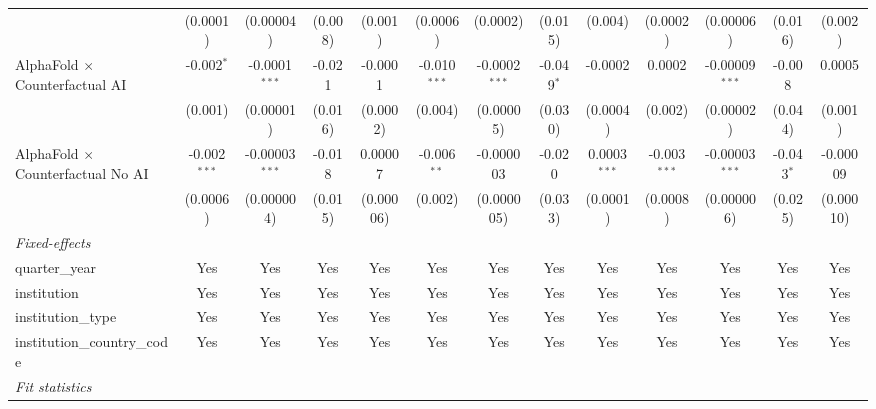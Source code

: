 \begin{tabular}{lcccccccccccc}
                                            & (0.0001)       & (0.00004)        & (0.008) & (0.001)       & (0.0006)       & (0.0002)        & (0.015)      & (0.004)        & (0.0002)       & (0.00006)        & (0.016)      & (0.002)\\   
   AlphaFold $\times$ Counterfactual AI     & -0.002$^{*}$   & -0.0001$^{***}$  & -0.021  & -0.0001       & -0.010$^{***}$ & -0.0002$^{***}$ & -0.049$^{*}$ & -0.0002        & 0.0002         & -0.00009$^{***}$ & -0.008       & 0.0005\\   
                                            & (0.001)        & (0.00001)        & (0.016) & (0.0002)      & (0.004)        & (0.00005)       & (0.030)      & (0.0004)       & (0.002)        & (0.00002)        & (0.044)      & (0.001)\\   
   AlphaFold $\times$ Counterfactual No AI  & -0.002$^{***}$ & -0.00003$^{***}$ & -0.018  & 0.00007       & -0.006$^{**}$  & -0.000003       & -0.020       & 0.0003$^{***}$ & -0.003$^{***}$ & -0.00003$^{***}$ & -0.043$^{*}$ & -0.00009\\   
                                            & (0.0006)       & (0.000004)       & (0.015) & (0.00006)     & (0.002)        & (0.000005)      & (0.033)      & (0.0001)       & (0.0008)       & (0.000006)       & (0.025)      & (0.00010)\\   
   \midrule
   \emph{Fixed-effects}\\
   quarter\_year                            & Yes            & Yes              & Yes     & Yes           & Yes            & Yes             & Yes          & Yes            & Yes            & Yes              & Yes          & Yes\\  
   institution                              & Yes            & Yes              & Yes     & Yes           & Yes            & Yes             & Yes          & Yes            & Yes            & Yes              & Yes          & Yes\\  
   institution\_type                        & Yes            & Yes              & Yes     & Yes           & Yes            & Yes             & Yes          & Yes            & Yes            & Yes              & Yes          & Yes\\  
   institution\_country\_code               & Yes            & Yes              & Yes     & Yes           & Yes            & Yes             & Yes          & Yes            & Yes            & Yes              & Yes          & Yes\\  
   \midrule
   \emph{Fit statistics}\\

\end{tabular}
